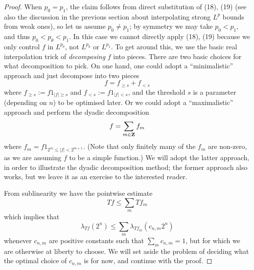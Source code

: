 \documentclass[10pt,reqno]{amsart}
\begin{document}
\begin{proof}
When $p_0=p_1$, the claim follows from direct substitution of (18), (19) (see also the discussion in the previous section about interpolating strong $L^p$ bounds from weak ones), so let us assume $p_0 \neq p_1$; by symmetry we may take $p_0 < p_1$, and thus $p_0 < p_\theta < p_1$. In this case we cannot directly apply (18), (19) because we only control $f$ in $L^{p_\theta}$, not $L^{p_0}$ or $L^{p_1}$. To get around this, we use the basic real interpolation trick of \emph{decomposing} $f$ into pieces. There are two basic choices for what decomposition to pick. On one hand, one could adopt a “minimalistic” approach and just decompose into two pieces
%
\[ f = f_{\geq s} + f_{<s}\]
%
where $f_{\geq s} := f 1_{|f| \geq s}$ and $f_{<s} := f 1_{|f| < s}$, and the threshold $s$ is a parameter (depending on $n$) to be optimised later. Or we could adopt a “maximalistic” approach and perform the dyadic decomposition
%
\[ f = \sum_{m \in {\bf Z}} f_m\]
%
where $f_m = f 1_{2^m \leq |f| < 2^{m+1}}$. (Note that only finitely many of the $f_m$ are non-zero, as we are assuming $f$ to be a simple function.) We will adopt the latter approach, in order to illustrate the dyadic decomposition method; the former approach also works, but we leave it as an exercise to the interested reader.

From sublinearity we have the pointwise estimate
%
    \[ Tf \leq \sum_m Tf_m\]
    which implies that
    \[ \lambda_{Tf}(2^n) \leq \sum_m \lambda_{Tf_m}( c_{n,m} 2^n )\]
    whenever $c_{n,m}$ are positive constants such that $\sum_m c_{n,m} = 1$, but for which we are otherwise at liberty to choose. We will set aside the problem of deciding what the optimal choice of $c_{n,m}$ is for now, and continue with the proof.


\end{proof}
\end{document}

